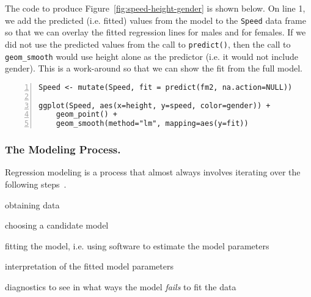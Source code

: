 The code to produce Figure~\ref{fig:speed-height-gender} is shown
below.  On line 1, we add the predicted (i.e. fitted) values from the
model to the \texttt{Speed} data frame so that we can overlay the
fitted regression lines for males and for females.  If we did not use
the predicted values from the call to \texttt{predict()}, then the
call to \texttt{geom\_smooth} would use height alone as the predictor
(i.e. it would not include gender).  This is a work-around so that we
can show the fit from the full model.

\begin{Verbatim}[numbers=left,xleftmargin=5mm,samepage=true]
Speed <- mutate(Speed, fit = predict(fm2, na.action=NULL))

ggplot(Speed, aes(x=height, y=speed, color=gender)) +
    geom_point() +
    geom_smooth(method="lm", mapping=aes(y=fit))
\end{Verbatim}


\subsubsection*{The Modeling Process.}
Regression modeling is a process that almost always involves iterating
over the following steps~\cite{chambers:1992}.
\begin{compactenum}
\item obtaining data \label{s1}
\item choosing a candidate model  \label{s2}
\item fitting the model, i.e. using software to  estimate the model parameters \label{s3}
\item interpretation of the fitted model parameters \label{s4}
\item diagnostics to see in what ways the model \emph{fails} to fit the data \label{s5}
\end{compactenum}


